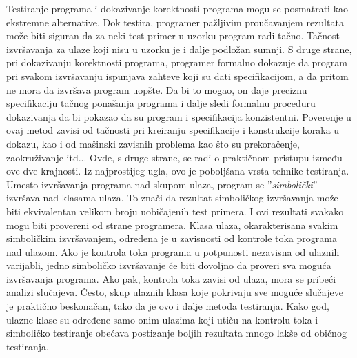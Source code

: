 \documentclass[a4paper]{article}
\begin{document}
Testiranje programa i dokazivanje korektnosti programa mogu se posmatrati kao ekstremne alternative. Dok testira, programer pažljivim proučavanjem rezultata može biti siguran da za neki test primer u uzorku program radi tačno. Tačnost izvršavanja za ulaze koji nisu u uzorku je i dalje podložan sumnji. S druge strane, pri dokazivanju korektnosti programa, programer formalno dokazuje da program pri svakom izvršavanju ispunjava zahteve koji su dati specifikacijom, a da pritom ne mora da izvršava program uopšte. Da bi to mogao, on daje preciznu specifikaciju tačnog ponašanja programa i dalje sledi formalnu proceduru dokazivanja da bi pokazao da su program i specifikacija konzistentni. Poverenje u ovaj metod zavisi od tačnosti pri kreiranju specifikacije i konstrukcije koraka u dokazu, kao i od mašinski zavisnih problema kao što su prekoračenje, zaokruživanje itd...  Ovde, s druge strane, se radi o praktičnom pristupu između ove dve krajnosti. Iz najprostijeg ugla, ovo je poboljšana vrsta tehnike testiranja. Umesto izvršavanja programa nad skupom ulaza, program se ''\textit{simbolički}'' izvršava nad klasama ulaza. To znači da rezultat simboličkog izvršavanja može biti ekvivalentan velikom broju uobičajenih test primera. I ovi rezultati svakako mogu biti provereni od strane programera. Klasa ulaza, okarakterisana svakim simboličkim izvršavanjem, određena je u zavisnosti od kontrole toka programa nad ulazom. Ako je kontrola toka programa u potpunosti nezavisna od ulaznih varijabli, jedno simboličko izvršavanje će biti dovoljno da proveri sva moguća izvršavanja programa. Ako pak, kontrola toka zavisi od ulaza, mora se pribeći analizi slučajeva. Često, skup ulaznih klasa koje pokrivaju sve moguće slučajeve je praktično beskonačan, tako da je ovo i dalje metoda testiranja. Kako god, ulazne klase su određene samo onim ulazima koji utiču na kontrolu toka i simboličko testiranje obećava postizanje boljih rezultata mnogo lakše od običnog testiranja.\cite{simbExec}
\end{document}
